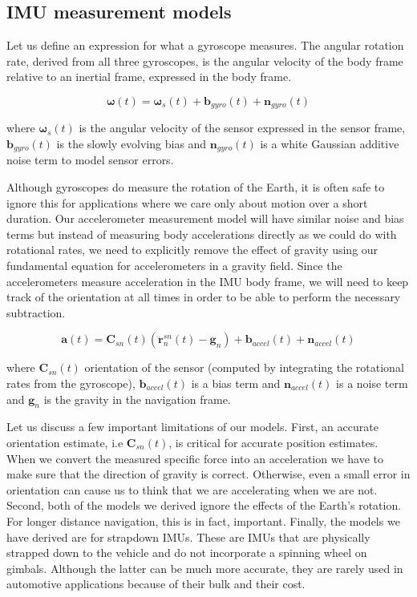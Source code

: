 \subsection{IMU measurement models}

Let us define an expression for
what a gyroscope measures. The angular rotation rate,
derived from all three gyroscopes, is the angular velocity of the body
frame relative to an inertial frame, expressed in the body frame. 


\begin{equation}
\boldsymbol{\omega}(t) = \boldsymbol{\omega}_s(t) + \mathbf{b}_{gyro}(t) + \mathbf{n}_{gyro}(t)
\end{equation}

where $\boldsymbol{\omega}_s(t)$ is the angular velocity of the sensor expressed in the sensor frame,
$\mathbf{b}_{gyro}(t)$ is the slowly evolving bias and $\mathbf{n}_{gyro}(t)$ is  a white Gaussian additive noise
term to model sensor errors. 

Although gyroscopes do measure the rotation of the Earth, it is often safe to ignore this for applications where we care
only about motion over a short duration. Our accelerometer measurement model
will have similar noise and bias terms but instead of measuring body
accelerations directly as we could do with rotational rates, we need to
explicitly remove the effect of gravity using our fundamental equation for
accelerometers in a gravity field. Since the accelerometers measure
acceleration in the IMU body frame, we will need to keep track of
the orientation at all times in order to be able to perform
the necessary subtraction. 


\begin{equation}
\mathbf{a}(t) = \mathbf{C}_{sn}(t) ( \ddot{\mathbf{r}}_{n}^{sn}(t) - \mathbf{g}_{n}) + \mathbf{b}_{accel}(t) + \mathbf{n}_{accel}(t)
\end{equation}


where $\mathbf{C}_{sn}(t)$ orientation of the sensor (computed by integrating the rotational rates from the gyroscope),
$\mathbf{b}_{accel}(t)$ is a bias term and $\mathbf{n}_{accel}(t)$ is  a noise
term and $\mathbf{g}_{n}$ is the gravity in the navigation frame. 

Let us discuss a few
important limitations of our models. First, an accurate orientation estimate, i.e $\mathbf{C}_{sn}(t)$, is
critical for accurate position estimates. When we convert the measured specific
force into an acceleration we have to make sure that the direction
of gravity is correct. Otherwise, even a small error in
orientation can cause us to think that we are accelerating when we are not. Second, both of the models
we derived ignore the effects of the Earth's rotation. For longer distance navigation,
this is in fact, important. Finally, the models we have
derived are for strapdown IMUs. These are IMUs that are physically
strapped down to the vehicle and do not incorporate
a spinning wheel on gimbals. Although the latter can be much more
accurate, they are rarely used in automotive applications because
of their bulk and their cost. 


